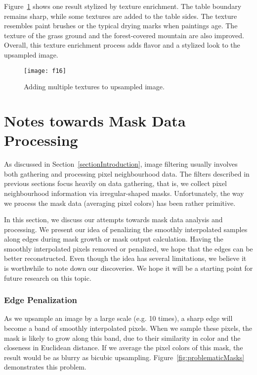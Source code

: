 Figure~\ref{fig:textureEnrichBestResult} shows one result stylized by texture enrichment. The table boundary remains sharp, while some textures are added to the table sides. The texture resembles paint brushes or the typical drying marks when paintings age. The texture of the grass ground and the forest-covered mountain are also improved. Overall, this texture enrichment process adds flavor and a stylized look to the upsampled image.

\begin{figure}[htbp]
\texttt{[image: f16]}
\caption{Adding multiple textures to upsampled image.}
\label{fig:textureEnrichBestResult}
\end{figure}

\section{Notes towards Mask Data Processing}\label{notes}

As discussed in Section~\ref{sectionIntroduction}, image filtering usually involves both gathering and processing pixel neighbourhood data. The filters described in previous sections focus heavily on data gathering, that is, we collect pixel neighbourhood information via irregular-shaped masks. Unfortunately, the way we process the mask data (averaging pixel colors) has been rather primitive. 

In this section, we discuss our attempts towards mask data analysis and processing. We present our idea of penalizing the smoothly interpolated samples along edges during mask growth or mask output calculation. Having the smoothly interpolated pixels removed or penalized, we hope that the edges can be better reconstructed. Even though the idea has several limitations, we believe it is worthwhile to note down our discoveries. We hope it will be a starting point for future research on this topic.

\subsubsection{Edge Penalization}

As we upsample an image by a large scale (e.g. 10 times), a sharp edge will become a band of smoothly interpolated pixels. When we sample these pixels, the mask is likely to grow along this band, due to their similarity in color and the closeness in Euclidean distance. If we average the pixel colors of this mask, the result would be as blurry as bicubic upsampling. Figure~\ref{fig:problematicMasks} demonstrates this problem. 

